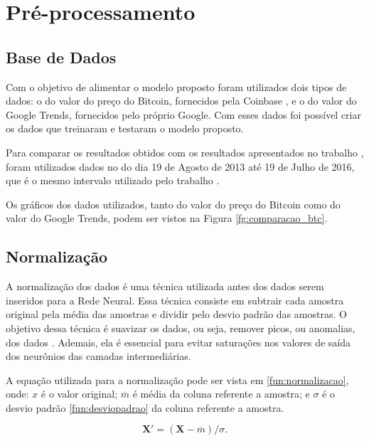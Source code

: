 \section{Pré-processamento}

\subsection{Base de Dados}
\label{subsec:base_de_dados}
 Com o objetivo de alimentar o modelo proposto foram utilizados dois tipos de dados: o do valor do preço do Bitcoin, fornecidos pela Coinbase \cite{Coinbase}, e o do valor do Google Trends, fornecidos pelo próprio Google. Com esses dados foi possível criar os dados que treinaram e testaram o modelo proposto.
 
Para comparar os resultados obtidos com os resultados apresentados no trabalho \cite{mcnally2016predicting}, foram utilizados dados no do dia 19 de Agosto de 2013 até 19 de Julho de 2016, que é o mesmo intervalo utilizado pelo trabalho \cite{mcnally2016predicting}.
 
 Os gráficos dos dados utilizados, tanto do valor do preço do Bitcoin como do valor do Google Trends, podem ser vistos na Figura \ref{fg:comparacao_btc}.
 
 \subsection{Normalização}
 \label{subsec:normalizacao}
A normalização dos dados é uma técnica utilizada antes dos dados serem inseridos para a Rede Neural. Essa técnica consiste em subtrair cada amostra original pela média das amostras e dividir pelo desvio padrão das amostras. O objetivo dessa técnica é suavizar os dados, ou seja, remover picos, ou anomalias, dos dados \cite{quackenbush2002microarray}. Ademais, ela é essencial para evitar saturações nos valores de saída dos neurônios das camadas intermediárias.

A equação utilizada para a normalização pode ser vista em \eqref{fun:normalizacao}, onde: $x$ é o valor original; $\overline{m}$ é média da coluna referente a amostra; e $\sigma$ é o desvio padrão \eqref{fun:desviopadrao} da coluna referente a amostra.

\begin{equation}
    \label{fun:normalizacao}
 \mathbf{X'} = (\mathbf{X}-\overline{m})/\sigma.
\end{equation}

